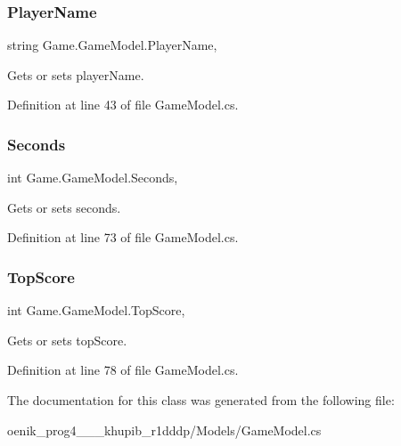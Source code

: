 \subsubsection{\texorpdfstring{PlayerName}{PlayerName}}
{\footnotesize\ttfamily string Game.\+Game\+Model.\+Player\+Name\hspace{0.3cm}{\ttfamily [get]}, {\ttfamily [set]}}



Gets or sets player\+Name. 



Definition at line 43 of file Game\+Model.\+cs.

\mbox{\label{class_game_1_1_game_model_a0ffff51770fa711cb6d14896baef1143}} 
\subsubsection{\texorpdfstring{Seconds}{Seconds}}
{\footnotesize\ttfamily int Game.\+Game\+Model.\+Seconds\hspace{0.3cm}{\ttfamily [get]}, {\ttfamily [set]}}



Gets or sets seconds. 



Definition at line 73 of file Game\+Model.\+cs.

\mbox{\label{class_game_1_1_game_model_af83a3c0ce62920e6b388dcef3ad6bfae}} 
\subsubsection{\texorpdfstring{TopScore}{TopScore}}
{\footnotesize\ttfamily int Game.\+Game\+Model.\+Top\+Score\hspace{0.3cm}{\ttfamily [get]}, {\ttfamily [set]}}



Gets or sets top\+Score. 



Definition at line 78 of file Game\+Model.\+cs.



The documentation for this class was generated from the following file\+:\begin{DoxyCompactItemize}
\item 
oenik\+\_\+prog4\+\_\+\_\+\_\+khupib\+\_\+r1dddp/\+Models/Game\+Model.\+cs\end{DoxyCompactItemize}
